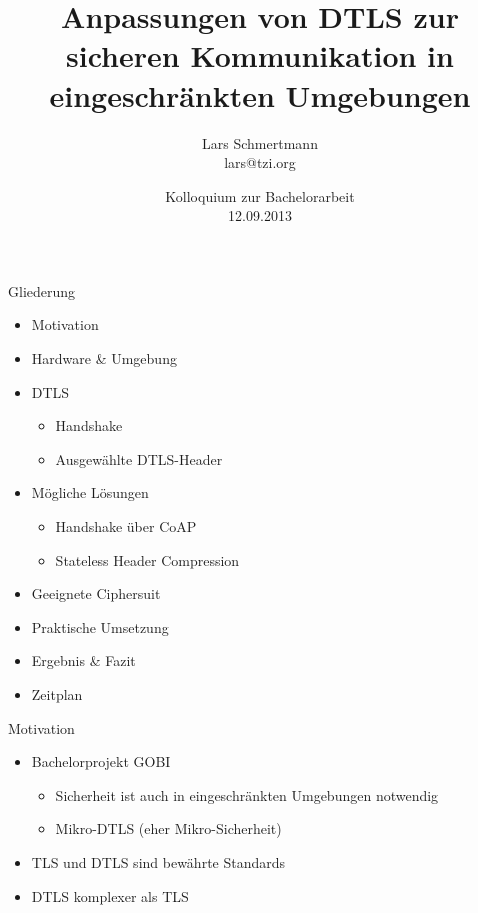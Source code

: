 \documentclass{beamer}
\title[Anpassungen von DTLS]%
{%
  Anpassungen von DTLS zur sicheren Kommunikation in eingeschränkten Umgebungen
}
\author[Lars Schmertmann]%
{
{Lars Schmertmann}\\
\vspace{.2cm}
{\scriptsize lars@tzi.org}
}
\institute{TZI, Universit\"{a}t Bremen, Deutschland}
\date[09.2013]%
{{Kolloquium zur Bachelorarbeit\\
12.09.2013}}%
\begin{document}

\begin{frame}
  \titlepage
\end{frame}

\begin{frame}{Gliederung}
  \begin{itemize}
    \item Motivation
    \item Hardware \& Umgebung
    \item DTLS
      \begin{itemize}
        \item Handshake
        \item Ausgewählte DTLS-Header
      \end{itemize}
    \item Mögliche Lösungen
    \begin{itemize}
      \item Handshake über CoAP
      \item Stateless Header Compression
    \end{itemize}
    \item Geeignete Ciphersuit
    \item Praktische Umsetzung
    \item Ergebnis \& Fazit
    \item Zeitplan
  \end{itemize}
\end{frame}

\begin{frame}{Motivation}
  \begin{itemize}
    \item Bachelorprojekt GOBI
    \begin{itemize}
      \item Sicherheit ist auch in eingeschränkten \newline Umgebungen notwendig
      \item Mikro-DTLS (eher Mikro-Sicherheit)
    \end{itemize}
    \item TLS und DTLS sind bewährte Standards
    \item DTLS komplexer als TLS
  \end{itemize}
\end{frame}
\end{document}
